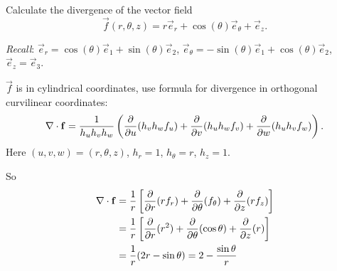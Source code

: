 \documentclass[10pt, a4paper]{article}
\begin{document}
\begin{problem}[$2004$ Question $1$]
    Calculate the divergence of the vector field
    \[
    \vec{f}(r, \theta, z) = r\vec{e}_r + \cos(\theta)\vec{e}_{\theta} + \vec{e}_z.
    \]

    \textit{Recall}:
    $\vec{e}_r = \cos(\theta)\vec{e}_1 + \sin(\theta)\vec{e}_2$,
    $\vec{e}_{\theta} = -\sin(\theta)\vec{e}_1 + \cos(\theta)\vec{e}_2$,
    $\vec{e}_z = \vec{e}_3$.

    \begin{solution}
        $\vec{f}$ is in cylindrical coordinates,
        use formula for divergence in orthogonal curvilinear coordinates:
        \[
        \mathbf{\nabla} \cdot \mathbf{f} = \frac{1}{h_uh_vh_w}\left(\frac{\partial }{\partial u}(h_vh_wf_u) + \frac{\partial }{\partial v}(h_uh_wf_v) + \frac{\partial }{\partial w}(h_uh_vf_w)\right).
        \]
        Here $(u, v, w) = (r, \theta, z)$,
        $h_r = 1$,
        $h_{\theta} = r$,
        $h_z = 1$.

        So
        \begin{align*}
            \mathbf{\nabla} \cdot \mathbf{f} &= \frac{1}{r}\left[\frac{\partial }{\partial r}(rf_r) + \frac{\partial }{\partial \theta}(f_{\theta}) + \frac{\partial }{\partial z}(rf_z)\right] \\
            &= \frac{1}{r}\left[\frac{\partial }{\partial r}(r ^ 2) + \frac{\partial }{\partial \theta}(\cos{\theta}) + \frac{\partial }{\partial z}(r)\right] \\
            &= \frac{1}{r}(2r - \sin{\theta}) = 2 - \frac{\sin{\theta}}{r}
        \end{align*}
    \end{solution}
\end{problem}
\end{document}
